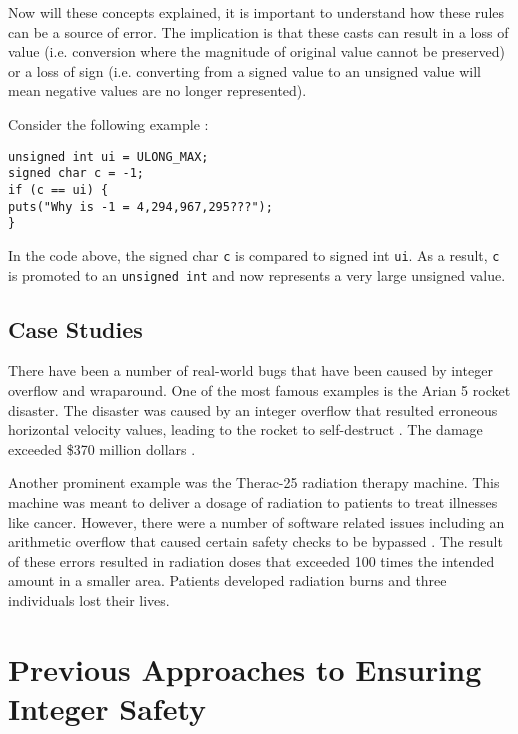 Now will these concepts explained, it is important to understand how these rules can be a source of error. The implication is that these casts can result in a loss of value (i.e. conversion where the magnitude of original value cannot be preserved) or a loss of sign (i.e. converting from a signed value to an unsigned value will mean negative values are no longer represented).

Consider the following example \cite{secure_coding} :

\begin{center}
\parbox{0.9\linewidth}{
\texttt{unsigned int ui = ULONG\_MAX;\\
signed char c = -1;\\
if (c == ui) \{\\
\hspace*{2em}puts("Why is -1 = 4,294,967,295???");\\
\}
}}
\end{center}

In the code above, the signed char \texttt{c} is compared to signed int \texttt{ui}. As a result, \texttt{c} is promoted to an \texttt{unsigned int} and now represents a very large unsigned value.

\subsection{Case Studies}

There have been a number of real-world bugs that have been caused by integer overflow and wraparound. One of the most famous examples is the Arian 5 rocket disaster. The disaster was caused by an integer overflow that resulted erroneous horizontal velocity values, leading to the rocket to self-destruct \cite{a5}. The damage exceeded \$370 million dollars \cite{a5_cost}.

Another prominent example was the Therac-25 radiation therapy machine. This machine was meant to deliver a dosage of radiation to patients to treat illnesses like cancer. However, there were a number of software related issues including an arithmetic overflow that caused certain safety checks to be bypassed \cite{therac}. The result of these errors resulted in radiation doses that exceeded 100 times the intended amount in a smaller area. Patients developed radiation burns and three individuals lost their lives.

\section{Previous Approaches to Ensuring Integer Safety}

